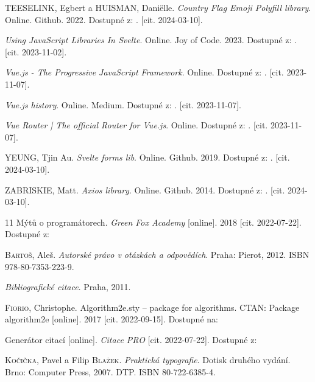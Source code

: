 \begin{thebibliography}{99}
\textsc{TEESELINK}, Egbert a \textsc{HUISMAN}, Daniëlle. \emph{Country Flag Emoji Polyfill library}. Online. Github. 2022. Dostupné z: . [cit. 2024-03-10].

\emph{Using JavaScript Libraries In Svelte}. Online. Joy of Code. 2023. Dostupné z: . [cit. 2023-11-02].

\emph{Vue.js - The Progressive JavaScript Framework}. Online. Dostupné z: . [cit. 2023-11-07].

\emph{Vue.js history}. Online. Medium. Dostupné z: . [cit. 2023-11-07].

\emph{Vue Router | The official Router for Vue.js}. Online. Dostupné z: . [cit. 2023-11-07].

\textsc{YEUNG}, Tjin Au. \emph{Svelte forms lib}. Online. Github. 2019. Dostupné z: . [cit. 2024-03-10].

\textsc{ZABRISKIE}, Matt. \emph{Axios library}. Online. Github. 2014. Dostupné z: . [cit. 2024-03-10].



11 Mýtů o programátorech. \emph{Green Fox Academy} [online]. 2018 [cit. 2022-07-22]. Dostupné z: 

\textsc{Bartoš}, Aleš. \emph{Autorské právo v otázkách a odpovědích}. Praha: Pierot, 2012. ISBN 978-80-7353-223-9.

\emph{Bibliografické citace}. Praha, 2011.

\textsc{Fiorio}, Christophe. Algorithm2e.sty -- package for algorithms. CTAN: Package algorithm2e [online]. 2017 [cit. 2022-09-15]. Dostupné na: 

Generátor citací [online]. \emph{Citace PRO} [cit. 2022-07-22]. Dostupné z: 

\textsc{Kočička}, Pavel a Filip \textsc{Blažek}. \emph{Praktická typografie}. Dotisk druhého vydání. Brno: Computer Press, 2007. DTP. ISBN 80-722-6385-4.



\end{thebibliography}

